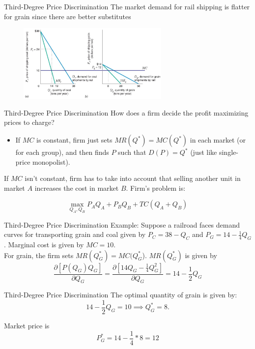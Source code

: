 \documentclass[11pt,t]{beamer}
\begin{document}
\begin{frame}{Third-Degree Price Discrimination}
  The market demand for rail shipping is flatter for grain since there are better substitutes

  \bigskip
  \begin{figure}
    \includegraphics[width=280px]{figures/fig12_9.jpg}
  \end{figure}
\end{frame}

\begin{frame}{Third-Degree Price Discrimination}
  How does a firm decide the profit maximizing prices to charge?

  \begin{itemize}
    \item If $MC$ is constant, firm just sets $MR(Q^*) = MC(Q^*)$ in each market (or for each group), and then finds $P$ such that $D(P) = Q^*$ (just like single-price monopolist).
  \end{itemize}

  \bigskip\pause
  If $MC$ isn't constant, firm has to take into account that selling another unit in market $A$ increases the cost in market $B$. Firm's problem is:

  $$
    \max_{Q_A,Q_B} P_A Q_A + P_B Q_B + TC(Q_A + Q_B)
  $$
\end{frame}

\begin{frame}{Third-Degree Price Discrimination}
  Example: Suppose a railroad faces demand curves for transporting grain and coal given by $P_C = 38 - Q_C$ and $P_G = 14 - \frac{1}{4} Q_G$. Marginal cost is given by $MC=10$.
  \\

  For grain, the firm sets $MR(Q_G^*) = MC(Q_G^*$). $MR(Q_G^*)$ is given by
  $$
    \frac{\partial [P(Q_G) Q_G]}{\partial Q_G} = \frac{\partial [14 Q_G - \frac{1}{4} Q_G^2]}{\partial Q_G}  = 14 - \frac{1}{2} Q_G
  $$
\end{frame}

\begin{frame}{Third-Degree Price Discrimination}
  The optimal quantity of grain is given by:
  $$
    14 - \frac{1}{2}Q_G = 10 \implies Q_G^* = 8.
  $$

  Market price is
  $$
    P_G^* = 14 - \frac{1}{4} * 8 = 12
  $$
\end{frame}
\end{document}
